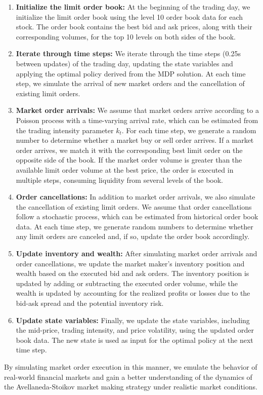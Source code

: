 \documentclass[letterpaper, 10 pt, conference]{ieeeconf}  %
\begin{document}
\begin{enumerate}
        \item \textbf{Initialize the limit order book:} At the beginning of the trading day, we initialize the limit order book using the level 10 order book data for each stock. The order book contains the best bid and ask prices, along with their corresponding volumes, for the top 10 levels on both sides of the book.
        \item \textbf{Iterate through time steps:} We iterate through the time steps (0.25s between updates) of the trading day, updating the state variables and applying the optimal policy derived from the MDP solution. At each time step, we simulate the arrival of new market orders and the cancellation of existing limit orders.
        \item \textbf{Market order arrivals:} We assume that market orders arrive according to a Poisson process with a time-varying arrival rate, which can be estimated from the trading intensity parameter $k_t$. For each time step, we generate a random number to determine whether a market buy or sell order arrives. If a market order arrives, we match it with the corresponding best limit order on the opposite side of the book. If the market order volume is greater than the available limit order volume at the best price, the order is executed in multiple steps, consuming liquidity from several levels of the book.
        \item \textbf{Order cancellations:} In addition to market order arrivals, we also simulate the cancellation of existing limit orders. We assume that order cancellations follow a stochastic process, which can be estimated from historical order book data. At each time step, we generate random numbers to determine whether any limit orders are canceled and, if so, update the order book accordingly.
        \item \textbf{Update inventory and wealth:} After simulating market order arrivals and order cancellations, we update the market maker's inventory position and wealth based on the executed bid and ask orders. The inventory position is updated by adding or subtracting the executed order volume, while the wealth is updated by accounting for the realized profits or losses due to the bid-ask spread and the potential inventory risk.
        \item \textbf{Update state variables:} Finally, we update the state variables, including the mid-price, trading intensity, and price volatility, using the updated order book data. The new state is used as input for the optimal policy at the next time step.
\end{enumerate}
By simulating market order execution in this manner, we emulate the behavior of real-world financial markets and gain a better understanding of the dynamics of the Avellaneda-Stoikov market making strategy under realistic market conditions. 
\end{document}
